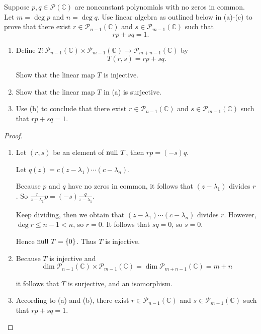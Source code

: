 \begin{exercise}
    Suppose $p, q\in\mathscr{P}(\mathbb{C})$ are nonconstant polynomials with no zeros in common. Let $m = \deg{p}$ and $n = \deg{q}$. Use linear algebra as outlined below in (a)-(c) to prove that there exist $r\in\mathscr{P}_{n-1}(\mathbb{C})$ and $s\in\mathscr{P}_{m-1}(\mathbb{C})$ such that
    \[
        rp + sq = 1.
    \]

    \begin{enumerate}[label={(\alph*)}]
        \item Define $T: \mathscr{P}_{n-1}(\mathbb{C})\times\mathscr{P}_{m-1}(\mathbb{C})\to \mathscr{P}_{m+n-1}(\mathbb{C})$ by
              \[
                  T(r, s) = rp + sq.
              \]

              Show that the linear map $T$ is injective.
        \item Show that the linear map $T$ in (a) is surjective.
        \item Use (b) to conclude that there exist $r\in\mathscr{P}_{n-1}(\mathbb{C})$ and $s\in\mathscr{P}_{m-1}(\mathbb{C})$ such that $rp + sq = 1$.
    \end{enumerate}
\end{exercise}

\begin{proof}
    \begin{enumerate}[label={(\alph*)}]
        \item Let $(r, s)$ be an element of $\operatorname{null}\,{T}$, then $rp = (-s)q$.

              Let $q(z) = c(z - \lambda_{1})\cdots (c - \lambda _{n})$.

              Because $p$ and $q$ have no zeros in common, it follows that $(z - \lambda_{1})$ divides $r$. So $\frac{r}{z - \lambda_{1}}p = (-s)\frac{q}{z - \lambda_{1}}$.

              Keep dividing, then we obtain that $(z - \lambda_{1})\cdots (c - \lambda _{n})$ divides $r$. However, $\deg r \leq n-1 < n$, so $r = 0$. It follows that $sq = 0$, so $s = 0$.

              Hence $\operatorname{null}\,{T} = \{0\}$. Thus $T$ is injective.
        \item Because $T$ is injective and
              \[
                  \dim \mathscr{P}_{n-1}(\mathbb{C})\times\mathscr{P}_{m-1}(\mathbb{C}) = \dim \mathscr{P}_{m+n-1}(\mathbb{C}) = m + n
              \]

              it follows that $T$ is surjective, and an isomorphism.
        \item According to (a) and (b), there exist $r\in\mathscr{P}_{n-1}(\mathbb{C})$ and $s\in\mathscr{P}_{m-1}(\mathbb{C})$ such that $rp + sq = 1$.
    \end{enumerate}
\end{proof}
\newpage
